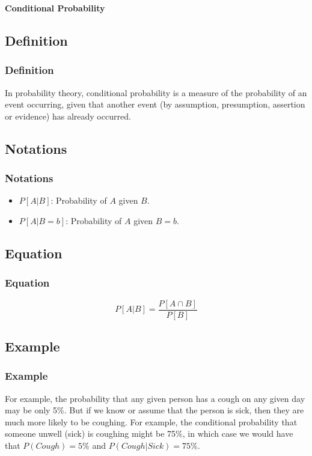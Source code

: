 \begin{frame}
    \Huge
    \begin{center}
        \textbf{Conditional Probability}
    \end{center}
\end{frame}

\subsection{Definition}\label{subsec:definition2}
\begin{frame}
    \frametitle{Definition}
    \begin{block}{}
        In probability theory, conditional probability is a measure of the probability of an event occurring, given that another event (by assumption, presumption, assertion or evidence) has already occurred.
    \end{block}
\end{frame}

\subsection{Notations}\label{subsec:notations2}
\begin{frame}
    \frametitle{Notations}
    \begin{block}{}
        \begin{itemize}
            \item $P[A|B]$: Probability of $A$ given $B$.
            \item $P[A|B=b]$: Probability of $A$ given $B=b$.
        \end{itemize}
    \end{block}
\end{frame}

\subsection{Equation}\label{subsec:equation2}
\begin{frame}
    \frametitle{Equation}
    \begin{block}{}
        \begin{equation}
            P[A|B] = \frac{P[A \cap B]}{P[B]}\label{eq:equation21}
        \end{equation}
    \end{block}
\end{frame}

\subsection{Example}\label{subsec:example2}
\begin{frame}
    \frametitle{Example}
    For example, the probability that any given person has a cough on any given day may be only 5\%.
    But if we know or assume that the person is sick, then they are much more likely to be coughing.
    For example, the conditional probability that someone unwell (sick) is coughing might be 75\%, in which case we would have that $P(Cough) = 5\%$ and $P(Cough|Sick) = 75\%$.
\end{frame}

